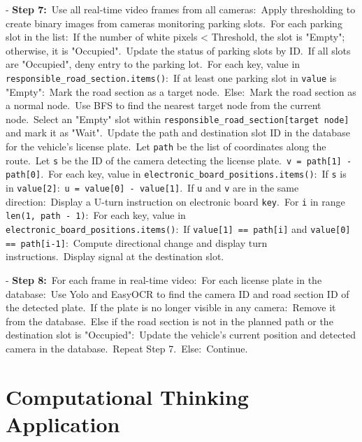 \documentclass{article}
\newcommand{\tab}{\hspace*{2em}}
\begin{document}
\begin{itemize}[label=-]
\noindent - \textbf{Step 7:}\
Use all real-time video frames from all cameras:\
\tab Apply thresholding to create binary images from cameras monitoring parking slots.\
\tab \tab For each parking slot in the list:\
\tab \tab \tab If the number of white pixels < Threshold, the slot is "Empty"; otherwise, it is "Occupied".\
\tab \tab Update the status of parking slots by ID.\
\tab \tab If all slots are "Occupied", deny entry to the parking lot.\
\tab For each key, value in \texttt{responsible\_road\_section.items()}:\
\tab \tab If at least one parking slot in \texttt{value} is "Empty":\
\tab \tab \tab Mark the road section as a target node.\
\tab \tab Else:\
\tab \tab \tab Mark the road section as a normal node.\
\tab Use BFS to find the nearest target node from the current node.\
\tab Select an "Empty" slot within \texttt{responsible\_road\_section[target node]} and mark it as "Wait".\
\tab Update the path and destination slot ID in the database for the vehicle's license plate.\
\tab Let \texttt{path} be the list of coordinates along the route.\
\tab Let \texttt{s} be the ID of the camera detecting the license plate.\
\tab \texttt{v = path[1] - path[0]}.\
\tab For each key, value in \texttt{electronic\_board\_positions.items()}:\
\tab \tab If \texttt{s} is in \texttt{value[2]}:\
\tab \tab \tab \texttt{u = value[0] - value[1]}.\
\tab \tab \tab If \texttt{u} and \texttt{v} are in the same direction:\
\tab \tab \tab \tab Display a U-turn instruction on electronic board \texttt{key}.\
\tab For \texttt{i} in range \texttt{len(1, path - 1)}:\
\tab \tab For each key, value in \texttt{electronic\_board\_positions.items()}:\
\tab \tab \tab If \texttt{value[1] == path[i]} and \texttt{value[0] == path[i-1]}:\
\tab \tab \tab \tab Compute directional change and display turn instructions.\
\tab Display signal at the destination slot.\

\noindent - \textbf{Step 8:}\
For each frame in real-time video:\
\tab For each license plate in the database:\
\tab \tab Use Yolo and EasyOCR to find the camera ID and road section ID of the detected plate.\
\tab \tab If the plate is no longer visible in any camera:\
\tab \tab \tab Remove it from the database.\
\tab \tab Else if the road section is not in the planned path or the destination slot is "Occupied":\
\tab \tab \tab Update the vehicle's current position and detected camera in the database.\
\tab \tab \tab Repeat Step 7.\
\tab \tab Else:\
\tab \tab \tab Continue.

\section{Computational Thinking Application}


\end{itemize}
\end{document}
